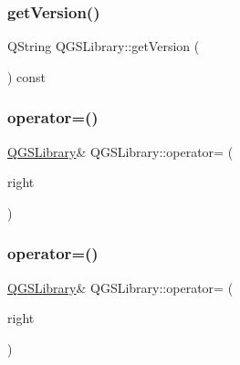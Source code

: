 \mbox{\label{class_q_g_s_library_a2f6629e0845ca92af5f7a88353b6d1f3}} 
\subsubsection{\texorpdfstring{get\+Version()}{getVersion()}}
{\footnotesize\ttfamily Q\+String Q\+G\+S\+Library\+::get\+Version (\begin{DoxyParamCaption}{ }\end{DoxyParamCaption}) const}

\mbox{\label{class_q_g_s_library_a038caacf56691ec718969d7bc334b47b}} 
\subsubsection{\texorpdfstring{operator=()}{operator=()}\hspace{0.1cm}{\footnotesize\ttfamily [1/2]}}
{\footnotesize\ttfamily \mbox{\hyperlink{class_q_g_s_library}{Q\+G\+S\+Library}}\& Q\+G\+S\+Library\+::operator= (\begin{DoxyParamCaption}\item[{const \mbox{\hyperlink{class_q_g_s_library}{Q\+G\+S\+Library}} \&}]{right }\end{DoxyParamCaption})\hspace{0.3cm}{\ttfamily [default]}}

\mbox{\label{class_q_g_s_library_a499828daf071ff7d47380bae8feb298c}} 
\subsubsection{\texorpdfstring{operator=()}{operator=()}\hspace{0.1cm}{\footnotesize\ttfamily [2/2]}}
{\footnotesize\ttfamily \mbox{\hyperlink{class_q_g_s_library}{Q\+G\+S\+Library}}\& Q\+G\+S\+Library\+::operator= (\begin{DoxyParamCaption}\item[{\mbox{\hyperlink{class_q_g_s_library}{Q\+G\+S\+Library}} \&\&}]{right }\end{DoxyParamCaption})\hspace{0.3cm}{\ttfamily [default]}}

